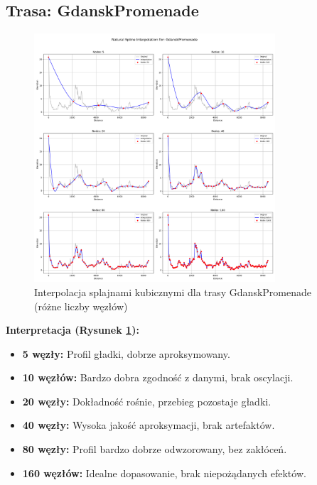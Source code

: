 \documentclass[11pt,a4paper]{article}
\begin{document}
\subsection{Trasa: GdanskPromenade}
\begin{figure}[H]
    \centering
    \includegraphics[width=0.8\textwidth]{plots/GdanskPromenade_Spline_basic.png}
    \caption{Interpolacja splajnami kubicznymi dla trasy GdanskPromenade (różne liczby węzłów)}
    \label{fig:promenade_splajny}
\end{figure}
\textbf{Interpretacja (Rysunek \ref{fig:promenade_splajny}):} 
\begin{itemize}
    \item \textbf{5 węzły:} Profil gładki, dobrze aproksymowany.
    \item \textbf{10 węzłów:} Bardzo dobra zgodność z danymi, brak oscylacji.
    \item \textbf{20 węzły:} Dokładność rośnie, przebieg pozostaje gładki.
    \item \textbf{40 węzły:} Wysoka jakość aproksymacji, brak artefaktów.
    \item \textbf{80 węzły:} Profil bardzo dobrze odwzorowany, bez zakłóceń.
    \item \textbf{160 węzłów:} Idealne dopasowanie, brak niepożądanych efektów.
\end{itemize}
\end{document}
